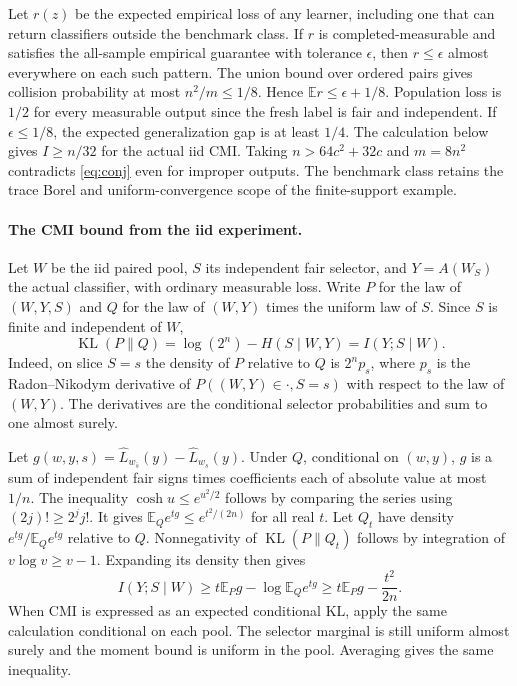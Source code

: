 \documentclass[11pt]{article}
\theoremstyle{definition}\newtheorem{definition}[theorem]{Definition}
\newcommand{\E}{\mathbb E}
\newcommand{\KL}{\operatorname{KL}}
\newcommand{\err}{\widehat L}
\begin{document}
Let $r(z)$ be the expected empirical loss of any learner, including
one that can return classifiers outside the benchmark class. If $r$
is completed-measurable and satisfies the all-sample empirical guarantee
with tolerance $\epsilon$, then $r\le\epsilon$ almost everywhere on each
such pattern. The union bound over ordered pairs gives collision
probability at most $n^2/m\le1/8$. Hence $\E r\le\epsilon+1/8$.
Population loss is $1/2$ for every measurable output since the fresh
label is fair and independent. If $\epsilon\le1/8$, the expected
generalization gap is at least $1/4$. The calculation below gives
$I\ge n/32$ for the actual iid CMI. Taking
$n>64c^2+32c$ and $m=8n^2$ contradicts \eqref{eq:conj} even for improper
outputs. The benchmark class retains the
trace Borel and uniform-convergence scope of the finite-support example.

\paragraph{The CMI bound from the iid experiment.}
Let $W$ be the iid paired pool, $S$ its independent fair selector, and
$Y=A(W_S)$ the actual classifier, with ordinary measurable loss. Write
$P$ for the law of $(W,Y,S)$ and $Q$ for the law of $(W,Y)$ times the
uniform law of $S$. Since $S$ is finite and independent of $W$,
\[
 \KL(P\|Q)=\log(2^n)-H(S\mid W,Y)=I(Y;S\mid W).
\]
Indeed, on slice $S=s$ the density of $P$ relative to $Q$ is $2^n p_s$,
where $p_s$ is the Radon--Nikodym derivative of
$P((W,Y)\in\cdot,S=s)$ with respect to the law of $(W,Y)$. The derivatives
are the conditional selector probabilities and sum to one almost surely.

Let $g(w,y,s)=\err_{w_{\bar s}}(y)-\err_{w_s}(y)$. Under $Q$, conditional
on $(w,y)$, $g$ is a sum of independent fair signs times coefficients each
of absolute value at most $1/n$. The inequality $\cosh u\le e^{u^2/2}$
follows by comparing the series using $(2j)!\ge 2^j j!$. It gives
$\E_Q e^{tg}\le e^{t^2/(2n)}$ for all real $t$. Let $Q_t$ have density
$e^{tg}/\E_Q e^{tg}$ relative to $Q$. Nonnegativity of $\KL(P\|Q_t)$
follows by integration of $v\log v\ge v-1$. Expanding its density then
gives
\[
 I(Y;S\mid W)\ge t\E_P g-\log\E_Q e^{tg}
 \ge t\E_P g-\frac{t^2}{2n}.
\]
When CMI is expressed as an expected conditional KL, apply the same
calculation conditional on each pool. The selector marginal is still
uniform almost surely and the moment bound is uniform in the pool.
Averaging gives the same inequality.
\end{document}
